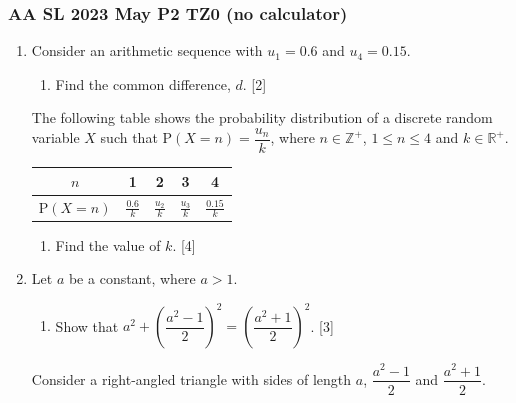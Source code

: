 \documentclass[12pt, twoside]{article}
\begin{document}
\subsubsection*{AA SL 2023 May P2 TZ0 (no calculator)}

\begin{enumerate}[itemsep=0.15cm]

\item[1.] Consider an arithmetic sequence with $u_1 = 0.6$ and $u_4 = 0.15$.

\begin{enumerate}[itemsep=0.1cm]
  \item[(a)] Find the common difference, $d$. \hfill [2]
\end{enumerate}
\vspace{0.5cm}
The following table shows the probability distribution of a discrete random variable $X$
such that $\mathrm{P}(X = n) = \dfrac{u_n}{k}$, where $n \in \mathbb{Z}^+$,
$1 \leq n \leq 4$ and $k \in \mathbb{R}^+$.

\renewcommand{\arraystretch}{1.4}
\begin{center}
\begin{tabular}{|c|c|c|c|c|}
    \hline
    $n$ & 1 & 2 & 3 & 4 \\
    \hline
    $\mathrm{P}(X = n)$ & $\frac{0.6}{k}$ & $\frac{u_2}{k}$ & $\frac{u_3}{k}$ & $\frac{0.15}{k}$ \\
    \hline
\end{tabular}
\end{center}
\renewcommand{\arraystretch}{1.0}

\begin{enumerate}[itemsep=0.1cm]
  \item[(b)] Find the value of $k$. \hfill [4]
\end{enumerate}

\newpage

\item[2.] [Maximum mark: 5]

Let $a$ be a constant, where $a > 1$.

\begin{enumerate}[itemsep=0.1cm]
  \item[(a)] Show that $a^2 + \left(\dfrac{a^2 - 1}{2}\right)^2 = \left(\dfrac{a^2 + 1}{2}\right)^2$. \hfill [3]
\end{enumerate}

Consider a right-angled triangle with sides of length $a$, $\dfrac{a^2 - 1}{2}$ and $\dfrac{a^2 + 1}{2}$.


\end{enumerate}
\end{document}

